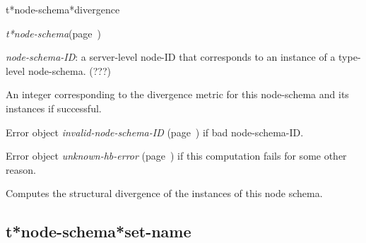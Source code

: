 \begin{description}
\item [Name:]  t*node-schema*divergence

\item [Class:] {\sl t*node-schema}\hfill(page~\pageref{t*node-schema})

\item [Parameters:]
\item {\sl node-schema-ID}:  a server-level node-ID that corresponds to an 
instance of a type-level node-schema. (???)



\item [Return-value:]
An integer corresponding to the divergence metric for 
this node-schema and its instances if successful.

Error object {\sl invalid-node-schema-ID} (page~\pageref{invalid-node-schema-ID}) if bad 
node-schema-ID.

Error object {\sl unknown-hb-error} (page~\pageref{unknown-hb-error}) if this computation
fails for some other reason.

\item [Description:]

Computes the structural divergence of the instances
of this node schema.

\item [Public:]



\end{description}
\horizontalline

\subsection{t*node-schema*set-name}
\label{t*node-schema*set-name}

